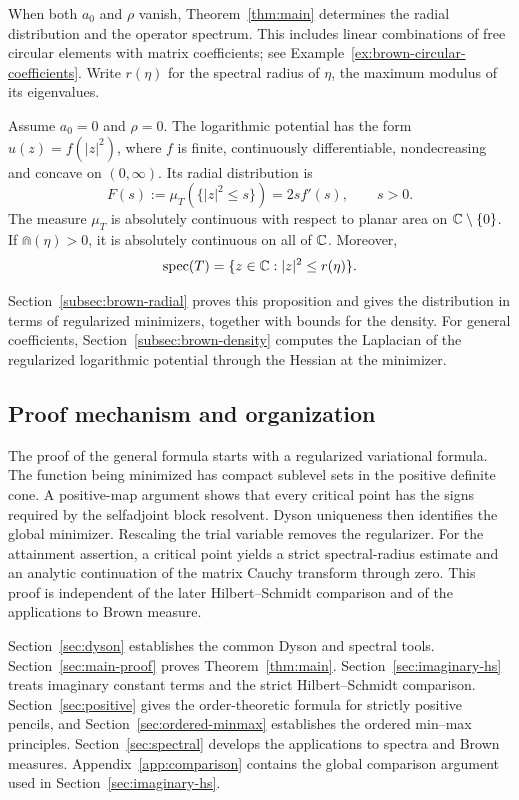 When both $a_0$ and $\rho$ vanish, Theorem~\ref{thm:main} determines the radial distribution and the operator spectrum.
This includes linear combinations of free circular elements with matrix coefficients; see Example~\ref{ex:brown-circular-coefficients}.
Write $r(\eta)$ for the spectral radius of $\eta$, the maximum modulus of its eigenvalues.

\begin{proposition}\label{prop:brown-radial}
Assume $a_0=0$ and $\rho=0$.
The logarithmic potential has the form $u(z)=f(|z|^2)$, where $f$ is finite, continuously differentiable, nondecreasing and concave on $(0,\infty)$.
Its radial distribution is
\begin{equation}\label{eq:brown-radial-cdf}
 F(s):=\mu_T(\{|z|^2\le s\})=2sf'(s),\qquad s>0.
\end{equation}
The measure $\mu_T$ is absolutely continuous with respect to planar area on $\mathbb C\setminus\{0\}$.
If $\Cap(\eta)>0$, it is absolutely continuous on all of $\mathbb C$.
Moreover,
\begin{equation}\label{eq:brown-spectral-disk}
 \operatorname{spec}(T)=\{z\in\mathbb C:|z|^2\le r(\eta)\}.
\end{equation}
\end{proposition}
Section~\ref{subsec:brown-radial} proves this proposition and gives the distribution in terms of regularized minimizers, together with bounds for the density.
For general coefficients, Section~\ref{subsec:brown-density} computes the Laplacian of the regularized logarithmic potential through the Hessian at the minimizer.

\subsection{Proof mechanism and organization}
The proof of the general formula starts with a regularized variational formula.
The function being minimized has compact sublevel sets in the positive definite cone.
A positive-map argument shows that every critical point has the signs required by the selfadjoint block resolvent.
Dyson uniqueness then identifies the global minimizer.
Rescaling the trial variable removes the regularizer.
For the attainment assertion, a critical point yields a strict spectral-radius estimate and an analytic continuation of the matrix Cauchy transform through zero.
This proof is independent of the later Hilbert--Schmidt comparison and of the applications to Brown measure.

Section~\ref{sec:dyson} establishes the common Dyson and spectral tools.
Section~\ref{sec:main-proof} proves Theorem~\ref{thm:main}.
Section~\ref{sec:imaginary-hs} treats imaginary constant terms and the strict Hilbert--Schmidt comparison.
Section~\ref{sec:positive} gives the order-theoretic formula for strictly positive pencils, and Section~\ref{sec:ordered-minmax} establishes the ordered min--max principles.
Section~\ref{sec:spectral} develops the applications to spectra and Brown measures.
Appendix~\ref{app:comparison} contains the global comparison argument used in Section~\ref{sec:imaginary-hs}.
